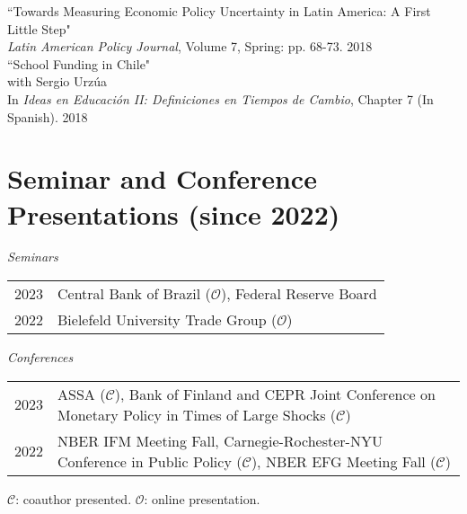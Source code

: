 \documentclass[10pt]{article}
\begin{document}
\noindent ``Towards Measuring Economic Policy Uncertainty in Latin America: A First Little Step" \\
\indent \textit{Latin American Policy Journal}, Volume 7, Spring: pp. 68-73. 2018\\[-0.125in]

\noindent ``School Funding in Chile"\\
\indent with Sergio Urz\'ua \\
\indent In  \textit{Ideas en Educaci\'on II: Definiciones en Tiempos de Cambio}, Chapter 7 (In Spanish). 2018

\section*{Seminar and Conference Presentations (since 2022)}

\noindent 
\emph{Seminars}\\[0.1in]
\begin{tabular}{@{}lp{15.5cm}}
2023& Central Bank of Brazil ($\mathcal{O}$), Federal Reserve Board\\
2022& Bielefeld University Trade Group ($\mathcal{O}$)%
\end{tabular}

\noindent \emph{Conferences}\\[0.1in]
\begin{tabular}{@{}lp{15.5cm}}
2023& ASSA ($\mathcal{C}$), Bank of Finland and CEPR Joint Conference on Monetary Policy in Times of Large Shocks ($\mathcal{C}$)\\
2022& NBER IFM Meeting Fall, Carnegie-Rochester-NYU Conference in Public Policy ($\mathcal{C}$), NBER EFG Meeting Fall ($\mathcal{C}$)
\end{tabular}

{\footnotesize $\mathcal{C}$: coauthor presented. $\mathcal{O}$: online presentation.}
\end{document}
